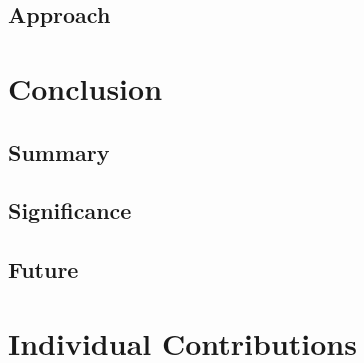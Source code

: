 \documentclass[conf]{new-aiaa}
\begin{document}
\subsection{Approach}

\section{Conclusion}

\subsection{Summary}

\subsection{Significance}

\subsection{Future}

\section{Individual Contributions}




\end{document}
